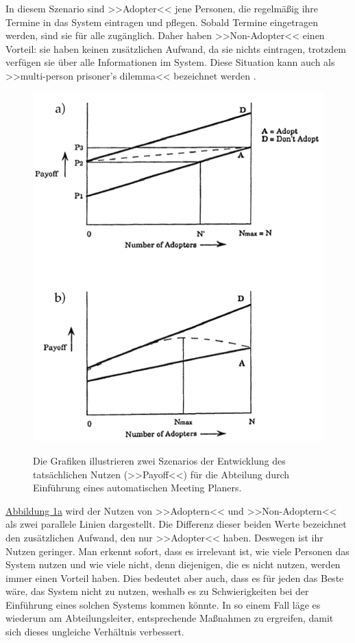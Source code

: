 	In diesem Szenario sind >>Adopter<< jene Personen, die regelmäßig ihre Termine in das System eintragen und pflegen. Sobald Termine eingetragen werden, sind sie für alle zugänglich. Daher haben >>Non-Adopter<< einen Vorteil: sie haben keinen zusätzlichen Aufwand, da sie nichts eintragen, trotzdem verfügen sie über alle Informationen im System. Diese Situation kann auch als >>multi-person prisoner's dilemma<< bezeichnet werden \citep{Schelling:1987}.

\begin{figure}
	{\includegraphics[width=1\linewidth]{gfx/markusMeetingPlanner}}
\caption[>>Payoff<< durch Nutzung eines automatischen Meeting Planers \newline \citep{Markus:1990}]{Die Grafiken illustrieren zwei Szenarios der Entwicklung des tatsächlichen Nutzen (>>Payoff<<) für die Abteilung durch Einführung eines automatischen Meeting Planers.}\label{fig:markusMeeting}
\end{figure}

\hyperref[fig:markusMeeting]{Abbildung \ref*{fig:markusMeeting}a} wird der Nutzen von >>Adoptern<< und >>Non-Adoptern<< als zwei parallele Linien dargestellt. Die Differenz dieser beiden Werte bezeichnet den zusätzlichen Aufwand, den nur >>Adopter<< haben. Deswegen ist ihr Nutzen geringer. Man erkennt sofort, dass es irrelevant ist, wie viele Personen das System nutzen und wie viele nicht, denn diejenigen, die es nicht nutzen, werden immer einen Vorteil haben. Dies bedeutet aber auch, dass es für jeden das Beste wäre, das System nicht zu nutzen, weshalb es zu Schwierigkeiten bei der Einführung eines solchen Systems kommen könnte. In so einem Fall läge es wiederum am Abteilungsleiter, entsprechende Maßnahmen zu ergreifen, damit sich dieses ungleiche Verhältnis verbessert. 

